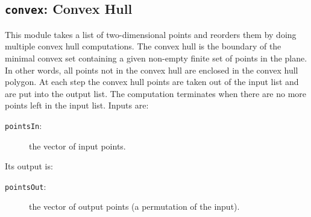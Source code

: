 \subsection{{\tt{convex}}:
	Convex Hull
	\label{s:toys-convex}}

This module takes a list of two-dimensional points and reorders them by
doing multiple convex hull computations. The convex hull is the boundary of
the minimal convex set containing a given non-empty finite set of points
in the plane. In other words, all points not in the convex hull are
enclosed in the convex hull polygon. At each step the convex hull points
are taken out of the input list and are put into the output list. The
computation terminates when there are no more points left in the input
list.  Inputs are:

\begin{description}
\item[{\tt{pointsIn}}:]
	the vector of input points.
\end{description}
Its output is:
\begin{description}
\item[{\tt{pointsOut}}:]
	the vector of output points (a permutation of the input).
\end{description}
